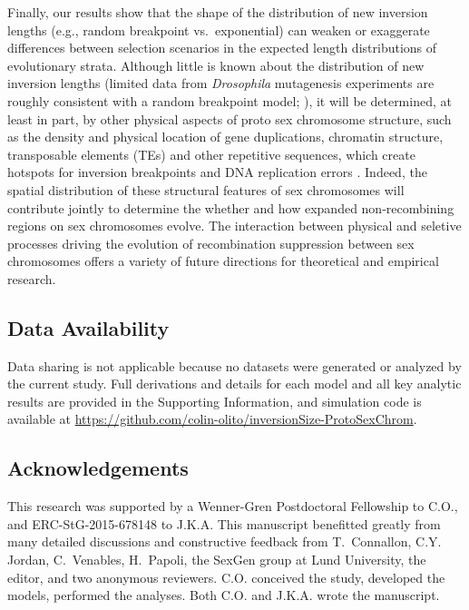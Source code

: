 \documentclass{article}
\begin{document}
Finally, our results show that the shape of the distribution of new inversion lengths (e.g., random breakpoint vs.~exponential) can weaken or exaggerate differences between selection scenarios in the expected length distributions of evolutionary strata. Although little is known about the distribution of new inversion lengths (limited data from {\itshape Drosophila} mutagenesis experiments are roughly consistent with a random breakpoint model; \citealt{KrimbasPowell1992}), it will be determined, at least in part, by other physical aspects of proto sex chromosome structure, such as the density and physical location of gene duplications, chromatin structure, transposable elements (TEs) and other repetitive sequences, which create hotspots for inversion breakpoints and DNA replication errors \citep[e.g.,][]{Charlesworth1994, PevznerTesler2003, PengPevznerTesler2006, LeeBatzer2008}. Indeed, the spatial distribution of these structural features of sex chromosomes will contribute jointly to determine the whether and how expanded non-recombining regions on sex chromosomes evolve. The interaction between physical and seletive processes driving the evolution of recombination suppression between sex chromosomes offers a variety of future directions for theoretical and empirical research.


\subsection*{Data Availability}
Data sharing is not applicable because no datasets were generated or analyzed by the current study. Full derivations and details for each model and all key analytic results are provided in the Supporting Information, and simulation code is available at \url{https://github.com/colin-olito/inversionSize-ProtoSexChrom}.

\subsection*{Acknowledgements}
This research was supported by a Wenner-Gren Postdoctoral Fellowship to C.O., and ERC-StG-2015-678148 to J.K.A. This manuscript benefitted greatly from many detailed discussions and constructive feedback from T.~Connallon, C.Y. Jordan, C.~Venables, H.~Papoli, the SexGen group at Lund University, the editor, and two anonymous reviewers. C.O. conceived the study, developed the models, performed the analyses. Both C.O. and J.K.A. wrote the manuscript.
\end{document}
